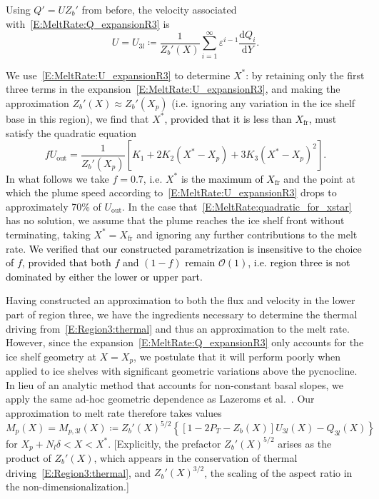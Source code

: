 \documentclass[openacc]{rsproca_new}%
\newcommand{\dd}[2]{\frac{\mathrm{d} #1}{\mathrm{d} #2}}
\newcommand{\order}[1]{\mathcal{O}(#1)}
\newcommand{\blue}[1]{{\color{blue} #1}}
\renewcommand{\blue}[1]{{\textcolor{black}{#1}}} %
\newcommand{\lt}{\delta} %
\newcommand{\Pt}{\textit{P}_T}
\newcommand{\out}{\text{out}}
\begin{document}
Using $Q' = U Z_b'$ from before, the velocity associated with~\eqref{E:MeltRate:Q_expansionR3} is
 \begin{equation}\label{E:MeltRate:U_expansionR3}
U = U_{3l} \coloneqq \frac{1}{Z_b'(X)} \sum_{i = 1}^{\infty} \varepsilon^{i-1} \dd{Q_i}{Y}.
\end{equation}

We use~\eqref{E:MeltRate:U_expansionR3} to determine $X^*$: by retaining only the first three terms in the expansion~\eqref{E:MeltRate:U_expansionR3}, and making the approximation  $Z_b'(X) \approx Z_b'(X_p)$ (i.e. ignoring any variation in the ice shelf base in this region), we find that $X^*$\blue{, provided that it is less than $X_{\text{fr}}$,} must satisfy the quadratic equation
\begin{equation}\label{E:MeltRate:quadratic_for_xstar}
f U_\out = \frac{1}{Z_b'(X_p)}\left[K_1 + 2 K_2(X^* - X_p) + 3K_3(X^* - X_p)^2 \right].
\end{equation}
In what follows we take $f = 0.7$, i.e. $X^*$ is the \blue{maximum of $X_{\text{fr}}$} and the point at which the plume speed according to~\eqref{E:MeltRate:U_expansionR3} drops to approximately 70\% of $U_\out$. In the case that~\eqref{E:MeltRate:quadratic_for_xstar} has no solution, we assume that the plume reaches the ice shelf front without terminating, taking $X^* = X_{\text{fr}}$ and ignoring any further contributions to the melt rate. \blue{We verified that our constructed parametrization is insensitive to the choice of $f$, provided that both $f$ and $(1-f)$ remain $\order{1}$, i.e. region three is not dominated by either the lower or upper part.}

Having constructed an approximation to both the flux and velocity in the lower part of region three, we have the ingredients necessary to determine the thermal driving from~\eqref{E:Region3:thermal} and thus an approximation to the melt rate. However, since the expansion~\eqref{E:MeltRate:Q_expansionR3} only accounts for the ice shelf geometry at $X = X_p$, we postulate that it will perform poorly when applied to ice shelves with significant geometric variations above the pycnocline. In lieu of an analytic method that accounts for non-constant basal slopes, we apply the same ad-hoc geometric dependence as Lazeroms et al.~\cite{Lazeroms2018TheCryo}. Our approximation to melt rate therefore takes values
\begin{equation}\label{E:MeltRate:regions3_l}
M_{p}(X) = M_{p,3l}(X)\coloneqq Z_b'(X)^{5/2}\left\{\left[1  - 2\Pt -  Z_b(X)\right] U_{3l}(X) - Q_{3l}(X)\right\}
\end{equation}
for $X_p + N_l \lt < X < X^*$. [Explicitly, the prefactor $Z_b'(X)^{5/2}$ arises as the product of $Z_b'(X)$, which appears in the conservation of thermal driving~\eqref{E:Region3:thermal}, and $Z_b'(X)^{3/2}$, the scaling of the aspect ratio in the non-dimensionalization.]
\end{document}
